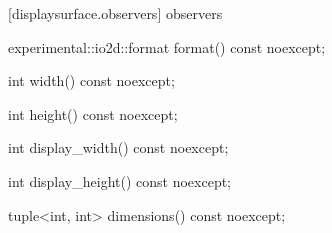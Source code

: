  [displaysurface.observers]{ observers}

\begin{itemdecl}
    experimental::io2d::format format() const noexcept;
\end{itemdecl}
\begin{itemdescr}
	\pnum
	\returns

\end{itemdescr}

\begin{itemdecl}
    int width() const noexcept;
\end{itemdecl}
\begin{itemdescr}
	\pnum
	\returns
	
\end{itemdescr}

\begin{itemdecl}
    int height() const noexcept;
\end{itemdecl}
\begin{itemdescr}
	\pnum
	\returns
	
\end{itemdescr}

\begin{itemdecl}
    int display_width() const noexcept;
\end{itemdecl}
\begin{itemdescr}
	\pnum
	\returns
	
\end{itemdescr}

\begin{itemdecl}
    int display_height() const noexcept;
\end{itemdecl}
\begin{itemdescr}
	\pnum
	\returns
	
\end{itemdescr}

\begin{itemdecl}
    tuple<int, int> dimensions() const noexcept;
\end{itemdecl}
\begin{itemdescr}
	\pnum
	\returns
	
\end{itemdescr}

